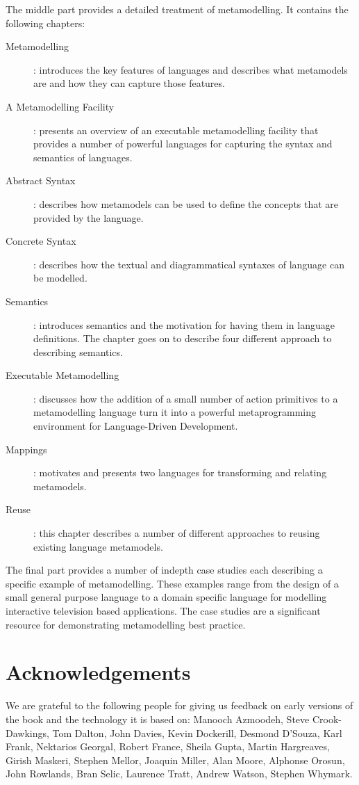 The middle part provides a detailed treatment of metamodelling. It
contains the following chapters:

\begin{description}
\item[Metamodelling]: introduces the key features of languages and
describes what metamodels are and how they can capture those
features. \item[A Metamodelling Facility]: presents an overview of
an executable metamodelling facility that provides a number of
powerful languages for capturing the syntax and semantics of
languages. \item[Abstract Syntax]: describes how metamodels can be
used to define the concepts that are provided by the language.
\item[Concrete Syntax]: describes how the textual and
diagrammatical syntaxes of language can be modelled. \item [
Semantics]: introduces semantics and the motivation for having
them in language definitions. The chapter goes on to describe four
different approach to describing semantics. \item[Executable
Metamodelling]: discusses how the addition of a small number of
action primitives to a metamodelling language turn it into a
powerful metaprogramming environment for Language-Driven
Development. \item[Mappings]: motivates and presents two languages
for transforming and relating metamodels. \item[Reuse]: this
chapter describes a number of different approaches to reusing
existing language metamodels.
\end{description}

The final part provides a number of indepth case studies each describing a
specific example of metamodelling.  These examples range from the design of
a small general purpose language to a domain specific language for modelling
interactive television based applications.  The case studies are a significant
resource for demonstrating metamodelling best practice.

\section*{Acknowledgements}

We are grateful to the following people for giving us feedback on
early versions of the book and the technology it is based on:
Manooch Azmoodeh, Steve Crook-Dawkings, Tom Dalton, John Davies,
Kevin Dockerill, Desmond D'Souza, Karl Frank, Nektarios Georgal,
Robert France, Sheila Gupta, Martin Hargreaves, Girish Maskeri,
Stephen Mellor, Joaquin Miller, Alan Moore, Alphonse Orosun, John
Rowlands, Bran Selic, Laurence Tratt, Andrew Watson, Stephen
Whymark.
